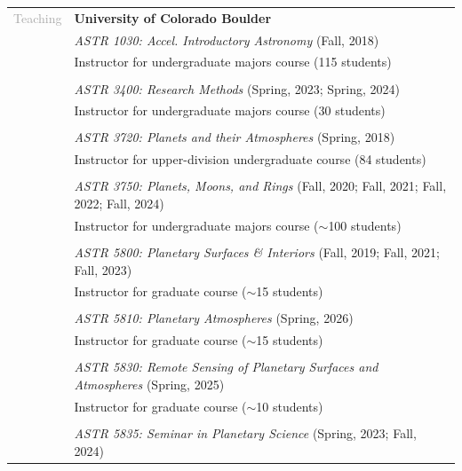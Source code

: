\documentclass[letterpaper,10pt,twoside]{article}
\begin{document}
\vspace{0.05in}

\noindent \begin{tabular}{@{} l l}
\large{\textcolor{darkgray}{Teaching}} & \textbf{University of Colorado Boulder} \\
& \textit{ASTR 1030: Accel. Introductory Astronomy} (Fall, 2018) \\
& \hspace{0.25in} Instructor for undergraduate majors course (115 students) \\
& \\
& \textit{ASTR 3400: Research Methods} (Spring, 2023; Spring, 2024) \\
& \hspace{0.25in} Instructor for undergraduate majors course (30 students) \\
& \\
& \textit{ASTR 3720: Planets and their Atmospheres} (Spring, 2018) \\
& \hspace{0.25in} Instructor for upper-division undergraduate course (84 students) \\
& \\
& \textit{ASTR 3750: Planets, Moons, and Rings} (Fall, 2020; Fall, 2021; Fall, 2022; Fall, 2024) \\
& \hspace{0.25in} Instructor for undergraduate majors course ($\sim$100 students) \\
& \\
& \textit{ASTR 5800: Planetary Surfaces \& Interiors} (Fall, 2019; Fall, 2021; Fall, 2023) \\
& \hspace{0.25in} Instructor for graduate course ($\sim$15 students) \\
& \\
& \textit{ASTR 5810: Planetary Atmospheres} (Spring, 2026) \\
& \hspace{0.25in} Instructor for graduate course ($\sim$15 students) \\
& \\
& \textit{ASTR 5830: Remote Sensing of Planetary Surfaces and Atmospheres} (Spring, 2025) \\
& \hspace{0.25in} Instructor for graduate course ($\sim$10 students) \\
& \\
& \textit{ASTR 5835: Seminar in Planetary Science} (Spring, 2023; Fall, 2024) \\

\end{tabular}
\end{document}

